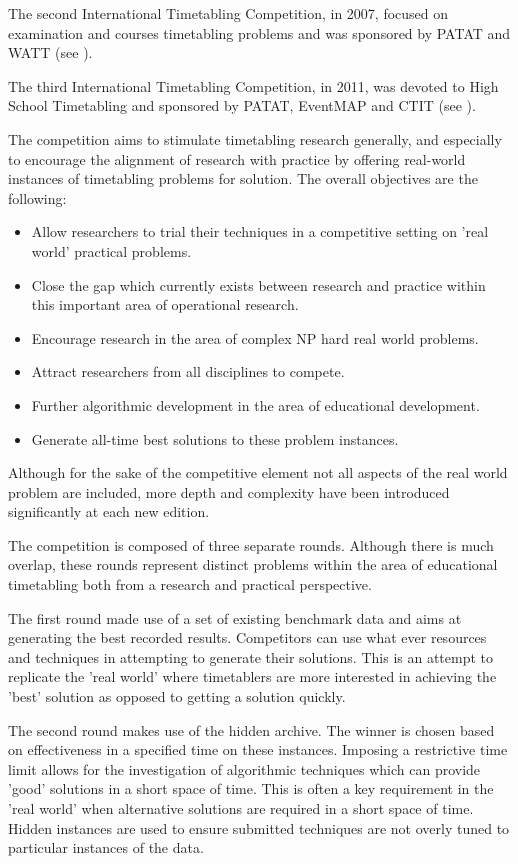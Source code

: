 The second International Timetabling Competition, in 2007, focused on examination and courses timetabling problems and was sponsored by PATAT and WATT (see \cite{ITC2007}).

The third International Timetabling Competition, in 2011, was devoted to High School Timetabling and sponsored by PATAT, EventMAP and CTIT (see \cite{ITC2011}).

The competition aims to stimulate timetabling research generally, and especially to encourage the alignment of research with practice by offering real-world instances of timetabling problems for solution. The overall objectives are the following:
\begin{itemize}
\item Allow researchers to trial their techniques in a competitive setting on 'real world' practical problems.
\item Close the gap which currently exists between research and practice within this important area of operational research.
\item Encourage research in the area of complex NP hard real world problems.
\item Attract researchers from all disciplines to compete.
\item Further algorithmic development in the area of educational development.
\item Generate all-time best solutions to these problem instances.
\end{itemize}

Although for the sake of the competitive element not all aspects of the real world problem are included, more depth and complexity have been introduced significantly at each new edition.

The competition is composed of three separate rounds. Although there is much overlap, these rounds represent distinct problems within the area of educational timetabling both from a research and practical perspective.

The first round made use of a set of existing benchmark data and aims at generating the best recorded results. Competitors can use what ever resources and techniques in attempting to generate their solutions. This is an attempt to replicate the 'real world' where timetablers are more interested in achieving the 'best' solution as opposed to getting a solution quickly.

The second round makes use of the hidden archive. The winner is chosen based on effectiveness in a specified time on these instances. Imposing a restrictive time limit allows for the investigation of algorithmic techniques which can provide 'good' solutions in a short space of time. This is often a key requirement in the 'real world' when alternative solutions are required in a short space of time. Hidden instances are used to ensure submitted techniques are not overly tuned to particular instances of the data.

